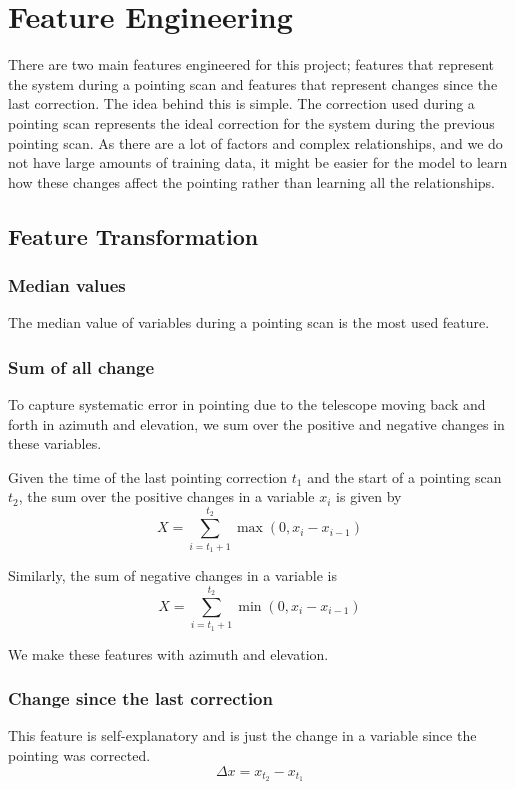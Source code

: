 \section{Feature Engineering}\label{sec:feature_engineering}
There are two main features engineered for this project; features that represent the system during a pointing scan and features that represent changes since the last correction. 
The idea behind this is simple. The correction used during a pointing scan represents the ideal correction for the system during the previous pointing scan.
As there are a lot of factors and complex relationships, and we do not have large amounts of training data, it might be easier for the model to learn 
how these changes affect the pointing rather than learning all the relationships.

\subsection{Feature Transformation} 
\subsubsection{Median values}
The median value of variables during a pointing scan is the most used feature.

\subsubsection{Sum of all change}
To capture systematic error in pointing due to the telescope moving back and forth in azimuth and elevation,
we sum over the positive and negative changes in these variables.

Given the time of the last pointing correction $t_1$ and the start of a pointing scan $t_2$, the sum over the positive changes in a variable $x_i$ is given by
\begin{equation}\label{eq:positive_int}
    X = \sum_{i=t_1+1}^{t_2} \max(0, x_i-x_{i-1})
\end{equation}

Similarly, the sum of negative changes in a variable is
\begin{equation}\label{eq:negative_int}
    X = \sum_{i=t_1+1}^{t_2} \min(0, x_i-x_{i-1})
\end{equation}

We make these features with azimuth and elevation.

\subsubsection{Change since the last correction}
This feature is self-explanatory and is just the change in a variable since the pointing was corrected.
\begin{equation}
    \Delta x = x_{t_2} - x_{t_1}
\end{equation}

